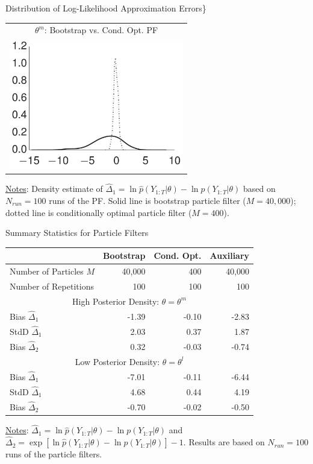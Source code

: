 \documentclass[presentation]{beamer}
\begin{document}
\begin{frame}[label={sec:orgff59350}]{Distribution of Log-Likelihood Approximation Errors\}}
\begin{center}
	\begin{tabular}{c}
		$\theta^m$: Bootstrap vs. Cond. Opt. PF \\
		\includegraphics[width=3in]{dsge1_me_paramax_lnlhbias.pdf} \\
	\end{tabular}
\end{center}
\uline{Notes}: Density estimate of \(\hat{\Delta}_1 = \ln \hat{p}(Y_{1:T}|\theta)- \ln p(Y_{1:T}|\theta)\)
based on \(N_{run}=100\) runs of the PF. Solid line is bootstrap particle filter
(\(M=40,000\)); dotted line is conditionally optimal particle filter
(\(M=400\)).
\end{frame}

\begin{frame}[label={sec:org53a88e0}]{Summary Statistics for Particle Filters}
\begin{center}
	\begin{tabular}{lrrr} \\ \hline \hline
		& Bootstrap & Cond. Opt. & Auxiliary \\ \hline
		Number of Particles $M$ & 40,000 & 400 & 40,000 \\
		Number of Repetitions   & 100 & 100 & 100 \\ \hline
		\multicolumn{4}{c}{High Posterior Density: $\theta = \theta^m$} \\ \hline
		Bias $\hat{\Delta}_1$ & -1.39 & -0.10 & -2.83 \\
		StdD $\hat{\Delta}_1$ &  2.03 &  0.37 &  1.87 \\
		Bias $\hat{\Delta}_2$ &  0.32 & -0.03 & -0.74 \\ \hline
		\multicolumn{4}{c}{Low Posterior Density: $\theta = \theta^l$} \\ \hline
		Bias $\hat{\Delta}_1$ & -7.01 & -0.11 & -6.44 \\
		StdD $\hat{\Delta}_1$ &  4.68 &  0.44 &  4.19 \\
		Bias $\hat{\Delta}_2$ & -0.70 & -0.02 & -0.50 \\ \hline
	\end{tabular}
\end{center}
\uline{Notes}: \(\hat{\Delta}_1 = \ln \hat{p}(Y_{1:T}|\theta) - \ln p(Y_{1:T}|\theta)\)
and \(\hat{\Delta}_2 = \exp[ \ln \hat{p}(Y_{1:T}|\theta) - \ln
	p(Y_{1:T}|\theta) ] - 1\). Results
are based on \(N_{run}=100\) runs of the particle filters.
\end{frame}
\end{document}
